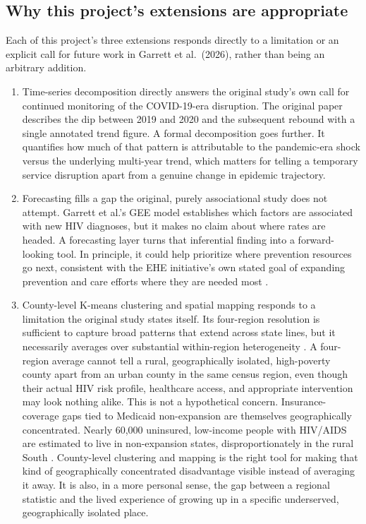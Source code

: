 \documentclass[11pt,letterpaper]{article}
\begin{document}
\subsection{Why this project's extensions are appropriate}
Each of this project's three extensions responds directly to a limitation or an explicit call for future work in Garrett et al.\ (2026), rather than being an arbitrary addition.

\begin{enumerate}[leftmargin=1.4em]
\item Time-series decomposition directly answers the original study's own call for continued monitoring of the COVID-19-era disruption. The original paper describes the dip between 2019 and 2020 and the subsequent rebound with a single annotated trend figure. A formal decomposition goes further. It quantifies how much of that pattern is attributable to the pandemic-era shock versus the underlying multi-year trend, which matters for telling a temporary service disruption apart from a genuine change in epidemic trajectory.
\item Forecasting fills a gap the original, purely associational study does not attempt. Garrett et al.'s GEE model establishes which factors are associated with new HIV diagnoses, but it makes no claim about where rates are headed. A forecasting layer turns that inferential finding into a forward-looking tool. In principle, it could help prioritize where prevention resources go next, consistent with the EHE initiative's own stated goal of expanding prevention and care efforts where they are needed most \cite{cdc_ehe}.
\item County-level K-means clustering and spatial mapping responds to a limitation the original study states itself. Its four-region resolution is sufficient to capture broad patterns that extend across state lines, but it necessarily averages over substantial within-region heterogeneity \cite{garrett2026}. A four-region average cannot tell a rural, geographically isolated, high-poverty county apart from an urban county in the same census region, even though their actual HIV risk profile, healthcare access, and appropriate intervention may look nothing alike. This is not a hypothetical concern. Insurance-coverage gaps tied to Medicaid non-expansion are themselves geographically concentrated. Nearly 60,000 uninsured, low-income people with HIV/AIDS are estimated to live in non-expansion states, disproportionately in the rural South \cite{snider2014, kates2021}. County-level clustering and mapping is the right tool for making that kind of geographically concentrated disadvantage visible instead of averaging it away. It is also, in a more personal sense, the gap between a regional statistic and the lived experience of growing up in a specific underserved, geographically isolated place.
\end{enumerate}
\end{document}
